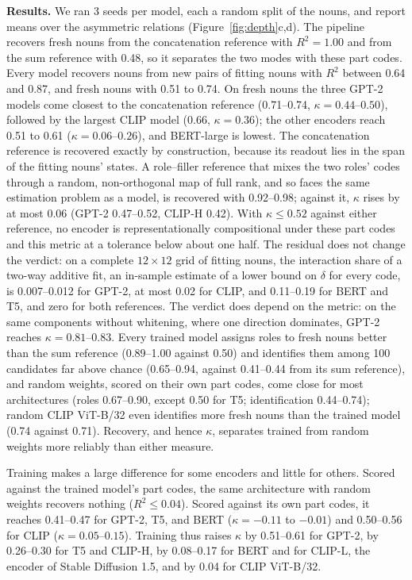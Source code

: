 \documentclass[10pt]{article}
\theoremstyle{plain}
\theoremstyle{remark}
\begin{document}
\textbf{Results.} We ran 3 seeds per model, each a random split of the nouns, and report means over the asymmetric relations (Figure~\ref{fig:depth}c,d). The pipeline recovers fresh nouns from the concatenation reference with $R^2 = 1.00$ and from the sum reference with 0.48, so it separates the two modes with these part codes. Every model recovers nouns from new pairs of fitting nouns with $R^2$ between 0.64 and 0.87, and fresh nouns with 0.51 to 0.74. On fresh nouns the three GPT-2 models come closest to the concatenation reference (0.71--0.74, $\kappa = 0.44$--$0.50$), followed by the largest CLIP model (0.66, $\kappa = 0.36$); the other encoders reach 0.51 to 0.61 ($\kappa = 0.06$--$0.26$), and BERT-large is lowest. The concatenation reference is recovered exactly by construction, because its readout lies in the span of the fitting nouns' states. A role--filler reference that mixes the two roles' codes through a random, non-orthogonal map of full rank, and so faces the same estimation problem as a model, is recovered with 0.92--0.98; against it, $\kappa$ rises by at most 0.06 (GPT-2 0.47--0.52, CLIP-H 0.42). With $\kappa \le 0.52$ against either reference, no encoder is representationally compositional under these part codes and this metric at a tolerance below about one half. The residual does not change the verdict: on a complete $12 \times 12$ grid of fitting nouns, the interaction share of a two-way additive fit, an in-sample estimate of a lower bound on $\delta$ for every code, is 0.007--0.012 for GPT-2, at most 0.02 for CLIP, and 0.11--0.19 for BERT and T5, and zero for both references. The verdict does depend on the metric: on the same components without whitening, where one direction dominates, GPT-2 reaches $\kappa = 0.81$--$0.83$. Every trained model assigns roles to fresh nouns better than the sum reference (0.89--1.00 against 0.50) and identifies them among 100 candidates far above chance (0.65--0.94, against 0.41--0.44 from its sum reference), and random weights, scored on their own part codes, come close for most architectures (roles 0.67--0.90, except 0.50 for T5; identification 0.44--0.74); random CLIP ViT-B/32 even identifies more fresh nouns than the trained model (0.74 against 0.71). Recovery, and hence $\kappa$, separates trained from random weights more reliably than either measure.

Training makes a large difference for some encoders and little for others. Scored against the trained model's part codes, the same architecture with random weights recovers nothing ($R^2 \le 0.04$). Scored against its own part codes, it reaches 0.41--0.47 for GPT-2, T5, and BERT ($\kappa = -0.11$ to $-0.01$) and 0.50--0.56 for CLIP ($\kappa = 0.05$--$0.15$). Training thus raises $\kappa$ by 0.51--0.61 for GPT-2, by 0.26--0.30 for T5 and CLIP-H, by 0.08--0.17 for BERT and for CLIP-L, the encoder of Stable Diffusion 1.5, and by 0.04 for CLIP ViT-B/32.
\end{document}
